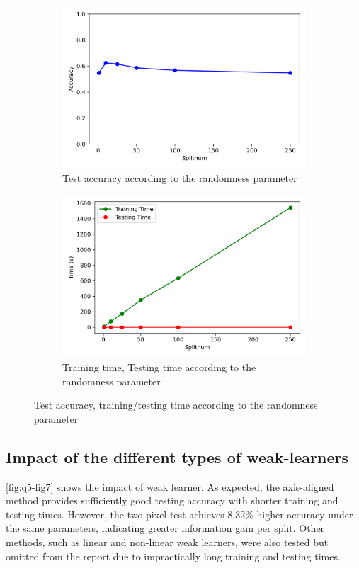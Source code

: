 \begin{figure}[htbp]
	\centering
	\begin{subfigure}[t]{0.4\linewidth}
		\centering
		\includegraphics[width=\linewidth]{image/q5-fig4.png}
		\caption{Test accuracy according to the randomness parameter}
		\label{fig:q5-fig4}
	\end{subfigure}%
	\quad
	\begin{subfigure}[t]{0.4\linewidth}
		\centering
		\includegraphics[width=\linewidth]{image/q5-fig5.png}
		\caption{Training time, Testing time according to the randomness parameter}
		\label{fig:q5-fig5}
	\end{subfigure}
	\caption{Test accuracy, training/testing time according to the randomness parameter}
\end{figure}


\subsection{Impact of the different types of weak-learners}
\cref{fig:q5-fig7} shows the impact of weak learner. As expected, the axis-aligned method provides sufficiently good testing accuracy with shorter training and testing times. However, the two-pixel test achieves 8.32\% higher accuracy under the same parameters, indicating greater information gain per split. Other methods, such as linear and non-linear weak learners, were also tested but omitted from the report due to impractically long training and testing times.

